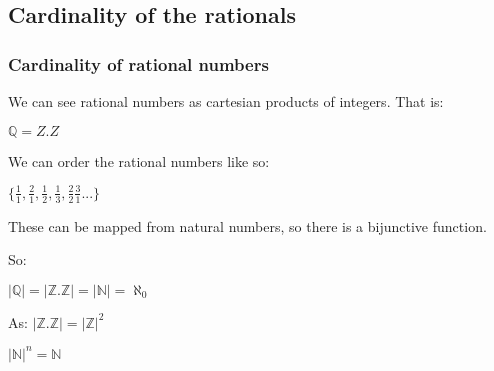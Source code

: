 \subsection{Cardinality of the rationals}

\subsubsection{Cardinality of rational numbers}

We can see rational numbers as cartesian products of integers. That is:

\(\mathbb{Q}=Z.Z\)

We can order the rational numbers like so:

\(\{\frac{1}{1},\frac{2}{1},\frac{1}{2},\frac{1}{3},\frac{2}{2}\frac{3}{1}...\}\)

These can be mapped from natural numbers, so there is a bijunctive function.

So:

\(|\mathbb{Q} |=|\mathbb{Z}.\mathbb{Z} |=|\mathbb{N} |=\aleph_0\)

As: \(|\mathbb{Z}.\mathbb{Z} |=|\mathbb{Z}|^2\)

\(|\mathbb{N}|^n=\mathbb{N}\)

